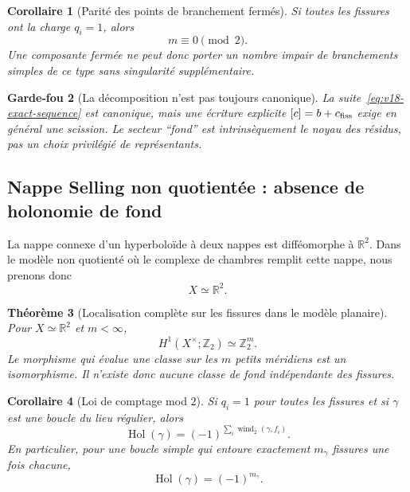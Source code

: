 \documentclass[11pt,a4paper]{article}
\newtheorem{theorem}{Théorème}[section]
\newtheorem{corollary}[theorem]{Corollaire}
\newtheorem{guardrail}[theorem]{Garde-fou}
\begin{document}
\begin{corollary}[Parité des points de branchement fermés]\label{cor:v18-even-branch}
Si toutes les fissures ont la charge $q_i=1$, alors
\begin{equation}\label{eq:v18-even-branch}
 \boxed{m\equiv0\pmod2.}
\end{equation}
Une composante fermée ne peut donc porter un nombre impair de branchements simples de ce type sans singularité supplémentaire.
\end{corollary}

\begin{guardrail}[La décomposition n'est pas toujours canonique]
La suite~\eqref{eq:v18-exact-sequence} est canonique, mais une écriture explicite $[c]=b+c_{\rm fiss}$ exige en général une scission. Le secteur ``fond'' est intrinsèquement le noyau des résidus, pas un choix privilégié de représentants.
\end{guardrail}

\subsection{Nappe Selling non quotientée : absence de holonomie de fond}

La nappe connexe d'un hyperboloïde à deux nappes est difféomorphe à $\mathbb R^2$. Dans le modèle non quotienté où le complexe de chambres remplit cette nappe, nous prenons donc
\[
 X\simeq\mathbb R^2.
\]

\begin{theorem}[Localisation complète sur les fissures dans le modèle planaire]\label{thm:v18-plane-localization}
Pour $X\simeq\mathbb R^2$ et $m<\infty$,
\begin{equation}\label{eq:v18-plane-H1}
 \boxed{H^1(X^\times;\mathbb Z_2)\simeq\mathbb Z_2^m.}
\end{equation}
Le morphisme qui évalue une classe sur les $m$ petits méridiens est un isomorphisme. Il n'existe donc aucune classe de fond indépendante des fissures.
\end{theorem}

\begin{corollary}[Loi de comptage mod $2$]\label{cor:v18-hol-count}
Si $q_i=1$ pour toutes les fissures et si $\gamma$ est une boucle du lieu régulier, alors
\begin{equation}\label{eq:v18-hol-count}
 \boxed{
 \operatorname{Hol}(\gamma)
 =(-1)^{\sum_i\operatorname{wind}_2(\gamma,f_i)}.}
\end{equation}
En particulier, pour une boucle simple qui entoure exactement $m_\gamma$ fissures une fois chacune,
\begin{equation}\label{eq:v18-hol-simple}
 \boxed{\operatorname{Hol}(\gamma)=(-1)^{m_\gamma}.}
\end{equation}
\end{corollary}
\end{document}
